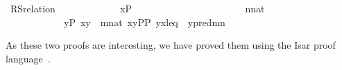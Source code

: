 \begin{isabelle}%
\isamarkupfalse%
\  RS{\isacharunderscore}relation{\isacharcolon}\isanewline
\ \ \isanewline
\ \ \ \ \ \ \ \ {}{\isacharcolon}\ \ {\isachardoublequoteopen}x{\isasymin}P{\isachardoublequoteclose}\isanewline
\ \ \ \ \ \ \ \ \ \ \ \ \isanewline
\ \ \ \ \ \ \ \ {}{\isacharcolon}\ \ {\isachardoublequoteopen}n{\isasymin}nat{\isachardoublequoteclose}\isanewline
\ \ \isanewline
\ \ \ \ \ \ \ \ \ \ \ \ {\isachardoublequoteopen}{\isasymexists}y{\isasymin}P{\isachardot}\ {\isasymlangle}x{\isacharcomma}y{\isasymrangle}\ {\isasymin}\ {\isacharparenleft}{\isasymlambda}m{\isasymin}nat{\isachardot}\ {\isacharbraceleft}{\isasymlangle}x{\isacharcomma}y{\isasymrangle}{\isasymin}P{\isacharasterisk}P{\isachardot}\ {\isasymlangle}y{\isacharcomma}x{\isasymrangle}{\isasymin}leq\ {\isasymand}\ y{\isasymin}{\isasymD}{\isacharbackquote}{\isacharparenleft}pred{\isacharparenleft}m{\isacharparenright}{\isacharparenright}{\isacharbraceright}{\isacharparenright}{\isacharbackquote}n{\isachardoublequoteclose}
\end{isabelle}
%
As these two proofs are interesting, we have proved them using the
Isar proof language~\cite{DBLP:conf/tphol/Wenzel99}.


